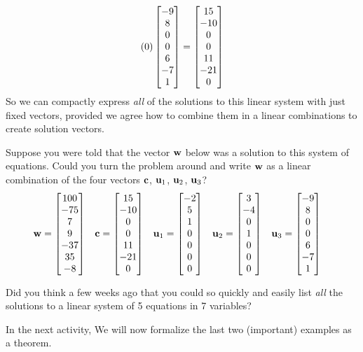 \documentclass{ximera}
\begin{document}
\begin{example}
\begin{align*}
    (0)\begin{bmatrix}-9\\ 8\\ 0\\ 0\\ 6\\ -7\\ 1\end{bmatrix}
    =
    \begin{bmatrix}15\\ -10\\ 0\\ 0\\ 11\\ -21\\ 0\end{bmatrix}
  \end{align*}
  So we can compactly express \textit{all} of the solutions to this
  linear system with just  fixed vectors, provided we agree
  how to combine them in a linear combinations to create solution
  vectors.

  Suppose you were told that the vector $\mathbf{w}$ below was a solution to this system of equations.  Could you turn the problem around and write $\mathbf{w}$ as a linear combination of the four vectors $\mathbf{c}$, $\mathbf{u}_1$, $\mathbf{u}_2$, $\mathbf{u}_3$?
  \begin{align*}
    \mathbf{w}&=\begin{bmatrix}100\\-75\\7\\9\\-37\\35\\-8\end{bmatrix}
            &
              \mathbf{c}&=\begin{bmatrix}15\\ -10\\ 0\\ 0\\ 11\\ -21\\ 0\end{bmatrix}
            &
              \mathbf{u}_1&=\begin{bmatrix}-2\\ 5\\ 1\\ 0\\ 0\\ 0\\ 0\end{bmatrix}
            &
              \mathbf{u}_2&=\begin{bmatrix}3\\ -4\\ 0\\ 1\\ 0\\ 0\\ 0\end{bmatrix}
            &
              \mathbf{u}_3&=\begin{bmatrix}-9\\ 8\\ 0\\ 0\\ 6\\ -7\\ 1\end{bmatrix}
  \end{align*}

\end{example}

Did you think a few weeks ago that you could so quickly and easily
list \textit{all} the solutions to a linear system of 5 equations in 7
variables?

In the next activity, We will now formalize the last two (important)
examples as a theorem.
\end{document}
